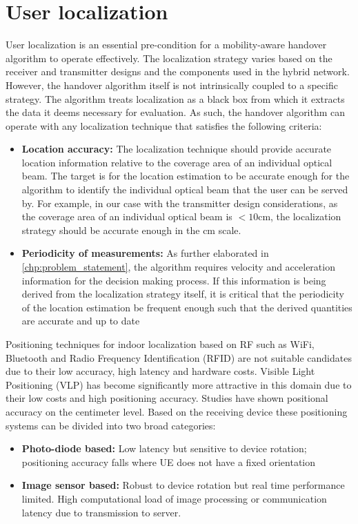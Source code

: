 \section{User localization}
\label{sec:mod-user-loc}
User localization is an essential pre-condition for a mobility-aware handover algorithm to operate effectively. The localization strategy varies based on the receiver and transmitter designs and the components used in the hybrid network. However, the handover algorithm itself is not intrinsically coupled to a specific strategy. The algorithm treats localization as a black box from which it extracts the data it deems necessary for evaluation. As such, the handover algorithm can operate with any localization technique that satisfies the following criteria:
\begin{itemize}
    \item \textbf{Location accuracy:} The localization technique should provide accurate location information relative to the coverage area of an individual optical beam. The target is for the location estimation to be accurate enough for the algorithm to identify the individual optical beam that the user can be served by. For example, in our case with the transmitter design considerations, as the coverage area of an individual optical beam is $< 10 \text{cm}$, the localization strategy should be accurate enough in the cm scale.
    \item \textbf{Periodicity of measurements:} As further elaborated in \ref{chp:problem_statement}, the algorithm requires velocity and acceleration information for the decision making process. If this information is being derived from the localization strategy itself, it is critical that the periodicity of the location estimation be frequent enough such that the derived quantities are accurate and up to date
\end{itemize}
Positioning techniques for indoor localization based on RF such as WiFi, Bluetooth and Radio Frequency Identification (RFID) are not suitable candidates due to their low accuracy, high latency and hardware costs\cite{lin_real-time_2020}. Visible Light Positioning (VLP) has become significantly more attractive in this domain due to their low costs and high positioning accuracy. Studies have shown positional accuracy on the centimeter level\cite{hassan_indoor_2015}\cite{xu_experimental_2018}. Based on the receiving device these positioning systems can be divided into two broad categories:
\begin{itemize}
    \item \textbf{Photo-diode based:} Low latency but sensitive to device rotation; positioning accuracy falls where UE does not have a fixed orientation
    \item \textbf{Image sensor based:} Robust to device rotation but real time performance limited. High computational load of image processing or communication latency due to transmission to server.
\end{itemize}
